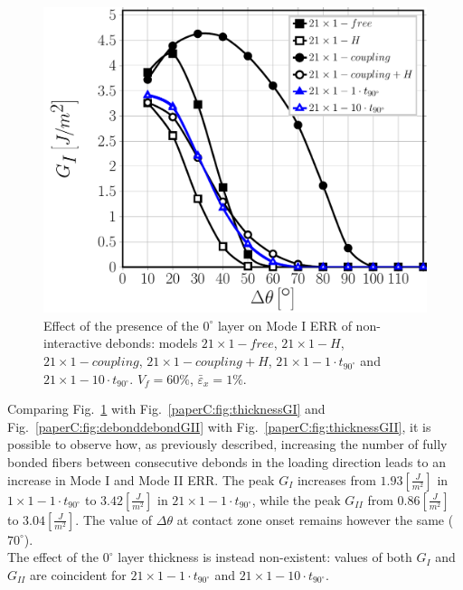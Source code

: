 \begin{figure}[!htb]
\centering
\includegraphics[width=\textwidth]{paperC/nx1-1-vf60-GI.pdf}
\caption{Effect of the presence of the $0^{\circ}$ layer on Mode I ERR of non-interactive debonds: models $21\times 1-free$, $21\times 1-H$, $21\times 1-coupling$, $21\times 1-coupling+H$, $21\times 1-1\cdot t_{90^{\circ}}$ and $21\times 1-10\cdot t_{90^{\circ}}$. $V_{f}=60\%$, $\bar{\varepsilon}_{x}=1\%$.}\label{paperC:fig:debonddebondGI}
\end{figure}

Comparing Fig.~\ref{paperC:fig:debonddebondGI} with Fig.~\ref{paperC:fig:thicknessGI} and Fig.~\ref{paperC:fig:debonddebondGII} with Fig.~\ref{paperC:fig:thicknessGII}, it is possible to observe how, as previously described, increasing the number of fully bonded fibers between consecutive debonds in the loading direction leads to an increase in Mode I and Mode II ERR. The peak $G_{I}$ increases from $1.93 \left[\frac{J}{m^{2}}\right]$ in $1\times 1-1\cdot t_{90^{\circ}}$ to $3.42 \left[\frac{J}{m^{2}}\right]$ in $21\times 1-1\cdot t_{90^{\circ}}$, while the peak $G_{II}$ from $0.86 \left[\frac{J}{m^{2}}\right]$ to $3.04 \left[\frac{J}{m^{2}}\right]$. The value of $\Delta\theta$ at contact zone onset remains however the same ($70^{\circ}$).\\
The effect of the $0^{\circ}$ layer thickness is instead non-existent: values of both $G_{I}$ and $G_{II}$ are coincident for $21\times 1-1\cdot t_{90^{\circ}}$ and $21\times 1-10\cdot t_{90^{\circ}}$.\\

